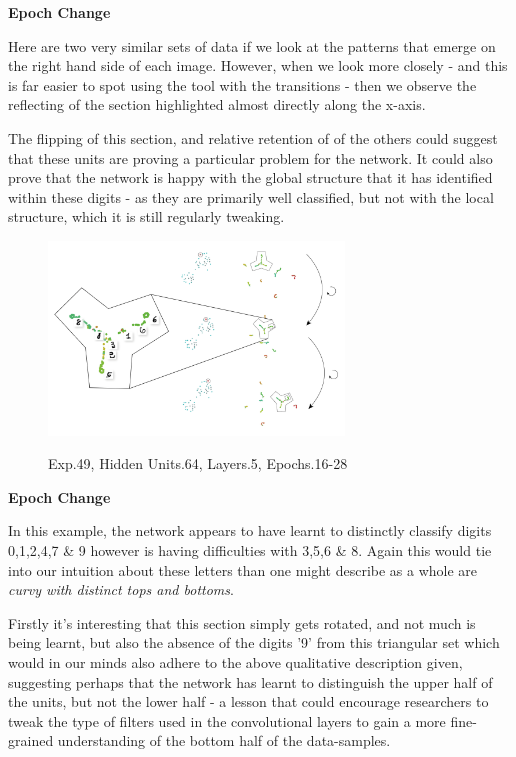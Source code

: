 \documentclass[a4paper,11pt,titlepage]{article}
\begin{document}
	\textbf{Epoch Change}
	\par 
	Here are two very similar sets of data if we look at the patterns that emerge on the right hand side of each image. However, when we look more closely - and this is far easier to spot using the tool with the transitions - then we observe the reflecting of the section highlighted almost directly along the x-axis. 
	\par 
	The flipping of this section, and relative retention of of the others could suggest that these units are proving a particular problem for the network. It could also prove that the network is happy with the global structure that it has identified within these digits - as they are primarily well classified, but not with the local structure, which it is still regularly tweaking.

	\begin{figure}[H]
    			\centering	
			{{\includegraphics[width=0.7\textwidth]
    				{img/conc_X49_H64_L5_E16-28.png} 
    			}}%
    			\caption{Exp.49, Hidden Units.64, Layers.5, Epochs.16-28}%
    		\label{fig:mnistHinton}
	\end{figure}

	\textbf{Epoch Change}
	\par 
	In this example, the network appears to have learnt to distinctly classify digits 0,1,2,4,7 \& 9 however is having difficulties with 3,5,6 \& 8. Again this would tie into our intuition about these letters than one might describe as a whole are \textit{curvy with distinct tops and bottoms}. 
	\par 
	Firstly it's interesting that this section simply gets rotated, and not much is being learnt, but also the absence of the digits '9' from this triangular set which would in our minds also adhere to the above qualitative description given, suggesting perhaps that the network has learnt to distinguish the upper half of the units, but not the lower half - a lesson that could encourage researchers to tweak the type of filters used in the convolutional layers to gain a more fine-grained understanding of the bottom half of the data-samples.
\end{document}
